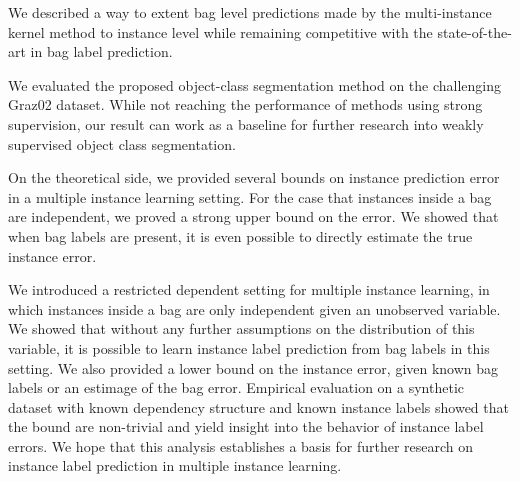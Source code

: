 We described a way to extent bag level predictions made by the multi-instance
kernel method to instance level while remaining competitive with the state-of-the-art
in bag label prediction.

We evaluated the proposed object-class segmentation method on the challenging
Graz02 dataset. While not reaching the performance of methods using strong supervision,
our result can work as a baseline for further research into weakly supervised object class
segmentation.

On the theoretical side, we provided several bounds on instance prediction
error in a multiple instance learning setting.  For the case that instances
inside a bag are independent, we proved a strong upper bound on the error.  We
showed that when bag labels are present, it is even possible to directly
estimate the true instance error.

We introduced a restricted dependent setting for multiple instance learning, in
which instances inside a bag are only independent given an unobserved variable.
We showed that without any further assumptions on the distribution of this
variable, it is possible to learn instance label prediction from bag labels in
this setting. We also provided a lower bound on the instance error,
given known bag labels or an estimage of the bag error.
Empirical evaluation on a synthetic dataset with known dependency structure and
known instance labels showed that the bound are non-trivial and yield insight
into the behavior of instance label errors.
We hope that this analysis establishes a basis for further research on instance
label prediction in multiple instance learning.
